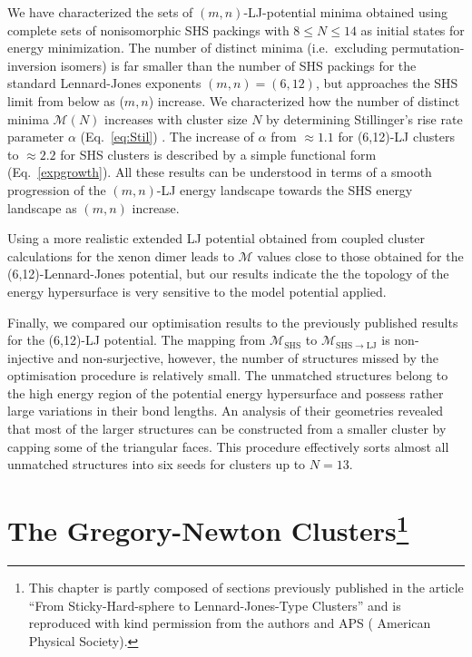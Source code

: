 We have characterized the sets of $(m,n)$-LJ-potential minima obtained using
complete sets of nonisomorphic \ac{SHS} packings with $8 \leq N \leq 14$
\autocite{Arkus_Minimalenergyclusters_2009,Arkus_DerivingFiniteSphere_2011,Hoy_Structurefinitesphere_2012,Hoy_Structuredynamicsmodel_2015,Holmes-Cerfon_EnumeratingRigidSphere_2016}
as initial states for energy minimization.  The number of distinct minima
(i.e.~excluding permutation-inversion isomers) is far smaller than the number
of \ac{SHS} packings for the standard Lennard-Jones exponents $(m,n) = (6,12)$, but
approaches the \ac{SHS} limit from below as ($m,n$) increase.  We characterized how
the number of distinct minima $\mathcal{M}(N)$ increases with cluster size $N$
by determining Stillinger's rise rate parameter $\alpha$ (Eq.\ \ref{eq:Stil})
\autocite{Stillinger_Exponentialmultiplicityinherent_1999}.  The increase of
$\alpha$ from $\approx 1.1$ for (6,12)-LJ clusters to $\approx 2.2$ for \ac{SHS}
clusters is described by a simple functional form (Eq.\ \ref{expgrowth}).  All
these results  can be understood in terms of a smooth progression of the
$(m,n)$-LJ energy landscape towards the \ac{SHS} energy landscape as $(m,n)$
increase.

Using a more realistic extended LJ potential obtained from coupled cluster
calculations for the xenon dimer
\autocite{Schwerdtfeger_ExtensionLennardJonespotential_2006,Jerabek_relativisticcoupledclusterinteraction_2017}
leads to $\mathcal{M}$ values close to those obtained for the
(6,12)-Lennard-Jones potential, but our results indicate the the topology of
the energy hypersurface is very sensitive to the model potential applied.  

Finally, we compared our optimisation results to the previously published
results for the (6,12)-LJ potential. The mapping from $\mathcal{M}_\text{SHS}$
to $\mathcal{M}_\mathrm{SHS\to LJ}$ is non-injective and non-surjective,
however, the number of structures missed by the optimisation procedure is
relatively small. The unmatched structures belong to the high energy region of
the potential energy hypersurface and possess rather large variations in their
bond lengths. An analysis of their geometries revealed that most of the larger
structures can be constructed from a smaller cluster by capping some of the
triangular faces. This procedure effectively sorts almost all unmatched
structures into six seeds for clusters up to $N=13$.


\chapter[The Gregory-Newton Clusters]{
    The Gregory-Newton Clusters\footnote{This chapter is partly composed of sections
    previously published in the article ``From Sticky-Hard-sphere to
    Lennard-Jones-Type Clusters''\autocite{} and is reproduced with kind
    permission from the authors and APS ( American Physical
    Society).}
}
\label{sec:thegregorynewtonclusters}

